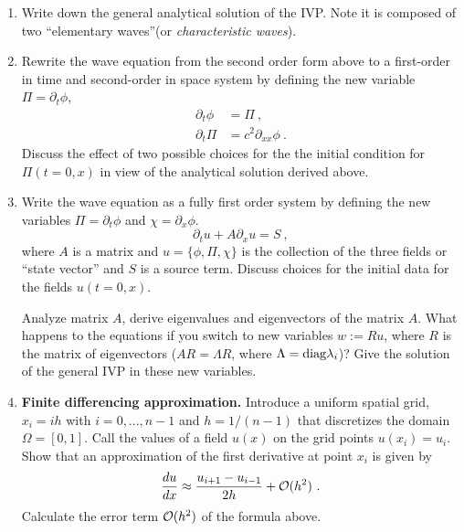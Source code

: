   \begin{enumerate}
  \item Write down the general analytical solution of the IVP. Note it
    is composed of two ``elementary waves''(or {\it characteristic waves}).
  \item Rewrite the wave equation from the second order form above to a
    first-order in time and second-order in space system by defining
    the new variable $\Pi = \partial_t \phi$, 
    \begin{subequations}
      \label{eq:waveq:1t2x}
      \begin{align}
        \partial_{t} \phi &= \Pi  \ ,\\
        \partial_{t} \Pi &= c^2 \partial_{xx} \phi  \ .
      \end{align}
    \end{subequations}
    Discuss the effect of two possible choices for the the initial
    condition for $\Pi(t=0,x)$ in view of the analytical solution derived above.
  \item Write the wave equation as a fully first order system by defining
    the new variables $\Pi = \partial_t \phi$ and $\chi = \partial_x
    \phi$.  
    \begin{equation}\label{eq:waveq:1}
    \partial_{t} u + A \partial_{x} u = S  \ ,
    \end{equation}
    where $A$ is a matrix and $u=\{\phi,\Pi,\chi\}$ is the collection
    of the three fields or ``state vector'' and $S$ is a source term.
    Discuss choices for the initial data for the fields $u(t=0,x)$.

    Analyze matrix $A$, derive eigenvalues and eigenvectors of the
    matrix $A$. What happens to the equations if you switch to new variables $w := Ru$,
    where $R$ is the matrix of eigenvectors ($AR = \Lambda R$, where
    $\Lambda={\rm diag}{\lambda_i}$)? Give the solution of the 
    general IVP in these new variables.
  \item {\bf Finite differencing approximation.} Introduce a uniform spatial grid, $x_i = i h $ with
    $i=0,...,n-1$ and $h=1/(n-1)$ that
    discretizes the domain $\Omega=[0,1]$. Call the values of a field
    $u(x)$ on the grid points $u(x_i)=u_i$. Show that an approximation
    of the first derivative at point $x_i$ is given by
    \begin{equation}
      \frac{du}{dx}\approx \frac{u_{i+1}-u_{i-1}}{2h}
      + {\cal O}(h^2) \ . 
    \end{equation}
    Calculate the error term ${\cal O}(h^2)$ of the formula above.


\end{enumerate}
